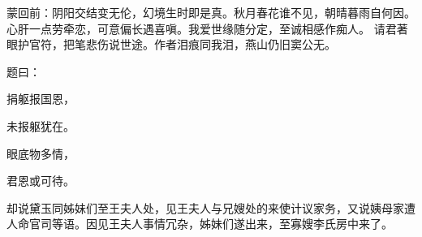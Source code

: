 
\begin{parag}
    \begin{note}蒙回前：阴阳交结变无伦，幻境生时即是真。秋月春花谁不见，朝晴暮雨自何因。心肝一点劳牵恋，可意偏长遇喜嗔。我爱世缘随分定，至诚相感作痴人。
        请君著眼护官符，把笔悲伤说世途。作者泪痕同我泪，燕山仍旧窦公无。\end{note}
\end{parag}

\begin{parag}
    题曰：
\end{parag}


\begin{poem}
    \begin{pl}捐躯报国恩，\end{pl}
    \begin{pl}未报躯犹在。\end{pl}

    \begin{pl}眼底物多情，\end{pl}
    \begin{pl}君恩或可待。\end{pl}
\end{poem}


\begin{parag}
    却说黛玉同姊妹们至王夫人处，见王夫人与兄嫂处的来使计议家务，又说姨母家遭人命官司等语。因见王夫人事情冗杂，姊妹们遂出来，至寡嫂李氏房中来了。
\end{parag}


